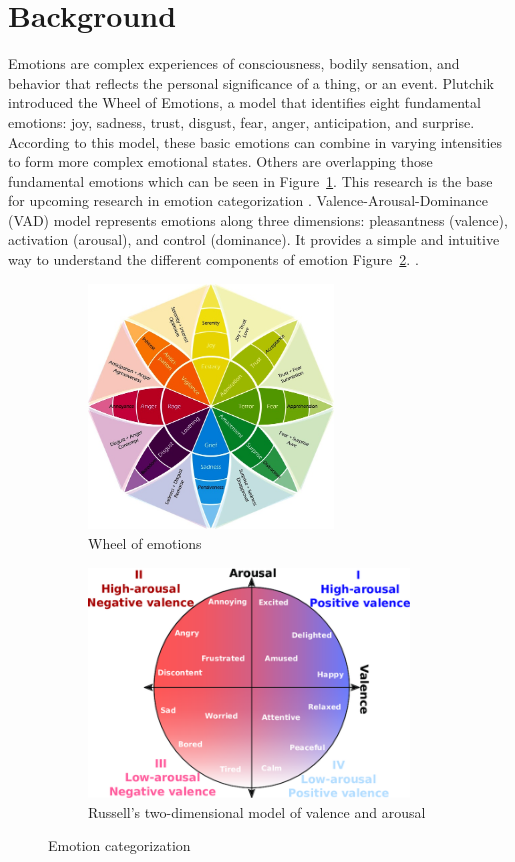 \section{Background}
\label{sec:background}

\par Emotions are complex experiences of consciousness, bodily sensation, and behavior that reflects the personal significance of a thing, or an event. Plutchik introduced the Wheel of Emotions, a model that identifies eight fundamental emotions: joy, sadness, trust, disgust, fear, anger, anticipation, and surprise. According to this model, these basic emotions can combine in varying intensities to form more complex emotional states. Others are overlapping those fundamental emotions which can be seen in Figure~\ref{fig:wheel}. This research is the base for upcoming research in emotion categorization \citep{plutchik1980general}. Valence-Arousal-Dominance (VAD) model represents emotions along three dimensions: pleasantness (valence), activation (arousal), and control (dominance). It provides a simple and intuitive way to understand the different components of emotion Figure~\ref{fig:two-dim}. \citep{oberlander2018analysis}.

\begin{figure}[h]
\centering
\begin{subfigure}[b]{0.45\textwidth}
    \includegraphics[height=2.56in,width=2.56in]{img/wheel-of-emotions.jpg}
    \caption{Wheel of emotions}
    \label{fig:wheel}
\end{subfigure}
\hfill
\begin{subfigure}[b]{0.45\textwidth}
    \includegraphics[height=2.4in,width=3.35in]{img/two-dim-modal.png}
    \caption{Russell's two-dimensional model of valence and arousal}
    \label{fig:two-dim}
\end{subfigure}
\caption{Emotion categorization}
\label{fig:combined}
\end{figure}

